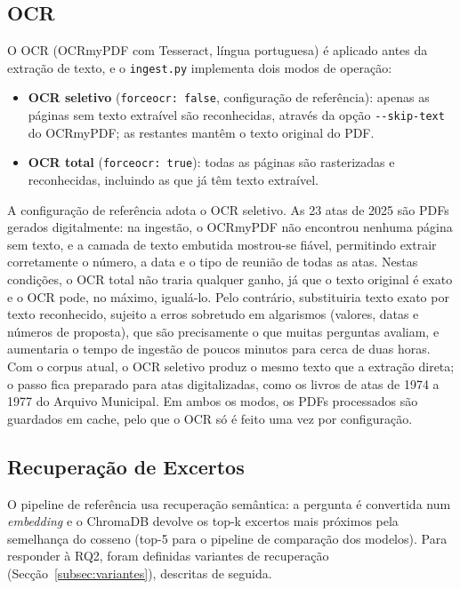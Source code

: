 \documentclass[11pt]{article}
\renewcommand{\_}{\textunderscore\allowbreak}
\begin{document}
\subsection{OCR}
\label{subsec:ocr}

O OCR (OCRmyPDF com Tesseract, língua portuguesa) é aplicado antes da extração de texto, e o \texttt{ingest.py} implementa dois modos de operação:

\begin{itemize}
    \item \textbf{OCR seletivo} (\texttt{force\_ocr: false}, configuração de referência): apenas as páginas sem texto extraível são reconhecidas, através da opção \texttt{-{}-skip-text} do OCRmyPDF; as restantes mantêm o texto original do PDF.
    \item \textbf{OCR total} (\texttt{force\_ocr: true}): todas as páginas são rasterizadas e reconhecidas, incluindo as que já têm texto extraível.
\end{itemize}

A configuração de referência adota o OCR seletivo. As 23 atas de 2025 são PDFs gerados digitalmente: na ingestão, o OCRmyPDF não encontrou nenhuma página sem texto, e a camada de texto embutida mostrou-se fiável, permitindo extrair corretamente o número, a data e o tipo de reunião de todas as atas. Nestas condições, o OCR total não traria qualquer ganho, já que o texto original é exato e o OCR pode, no máximo, igualá-lo. Pelo contrário, substituiria texto exato por texto reconhecido, sujeito a erros sobretudo em algarismos (valores, datas e números de proposta), que são precisamente o que muitas perguntas avaliam, e aumentaria o tempo de ingestão de poucos minutos para cerca de duas horas. Com o corpus atual, o OCR seletivo produz o mesmo texto que a extração direta; o passo fica preparado para atas digitalizadas, como os livros de atas de 1974 a 1977 do Arquivo Municipal. Em ambos os modos, os PDFs processados são guardados em cache, pelo que o OCR só é feito uma vez por configuração.

\subsection{Recuperação de Excertos}
\label{subsec:pesquisa}

O pipeline de referência usa recuperação semântica: a pergunta é convertida num \textit{embedding} e o ChromaDB devolve os top-k excertos mais próximos pela semelhança do cosseno (top-5 para o pipeline de comparação dos modelos). Para responder à RQ2, foram definidas variantes de recuperação (Secção~\ref{subsec:variantes}), descritas de seguida.
\end{document}
